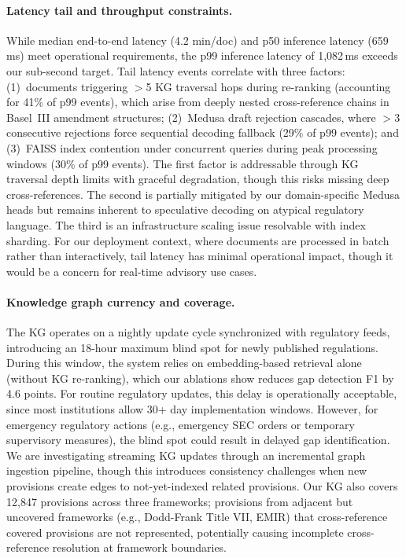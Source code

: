 \documentclass[11pt]{article}
\begin{document}
\paragraph{Latency tail and throughput constraints.} While median end-to-end latency (4.2 min/doc) and p50 inference latency (659\,ms) meet operational requirements, the p99 inference latency of 1{,}082\,ms exceeds our sub-second target. Tail latency events correlate with three factors: (1)~documents triggering $>$5 KG traversal hops during re-ranking (accounting for 41\% of p99 events), which arise from deeply nested cross-reference chains in Basel~III amendment structures; (2)~Medusa draft rejection cascades, where $>$3 consecutive rejections force sequential decoding fallback (29\% of p99 events); and (3)~FAISS index contention under concurrent queries during peak processing windows (30\% of p99 events). The first factor is addressable through KG traversal depth limits with graceful degradation, though this risks missing deep cross-references. The second is partially mitigated by our domain-specific Medusa heads but remains inherent to speculative decoding on atypical regulatory language. The third is an infrastructure scaling issue resolvable with index sharding. For our deployment context, where documents are processed in batch rather than interactively, tail latency has minimal operational impact, though it would be a concern for real-time advisory use cases.

\paragraph{Knowledge graph currency and coverage.} The KG operates on a nightly update cycle synchronized with regulatory feeds, introducing an 18-hour maximum blind spot for newly published regulations. During this window, the system relies on embedding-based retrieval alone (without KG re-ranking), which our ablations show reduces gap detection F1 by 4.6 points. For routine regulatory updates, this delay is operationally acceptable, since most institutions allow 30+ day implementation windows. However, for emergency regulatory actions (e.g., emergency SEC orders or temporary supervisory measures), the blind spot could result in delayed gap identification. We are investigating streaming KG updates through an incremental graph ingestion pipeline, though this introduces consistency challenges when new provisions create edges to not-yet-indexed related provisions. Our KG also covers 12{,}847 provisions across three frameworks; provisions from adjacent but uncovered frameworks (e.g., Dodd-Frank Title VII, EMIR) that cross-reference covered provisions are not represented, potentially causing incomplete cross-reference resolution at framework boundaries.
\end{document}
